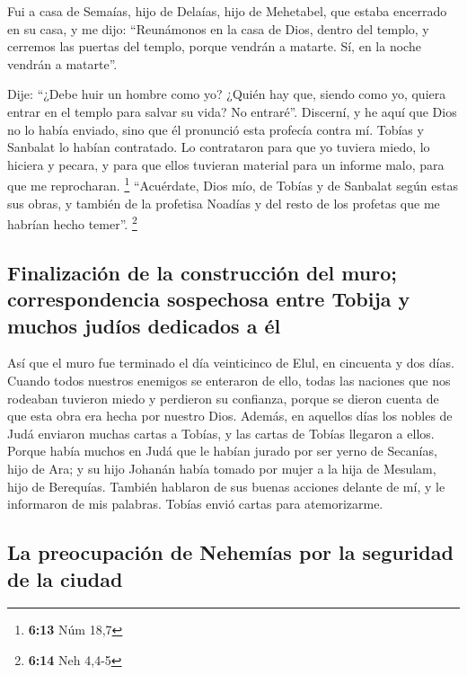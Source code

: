  Fui a casa de Semaías, hijo de Delaías, hijo de
Mehetabel, que estaba encerrado en su casa, y me dijo: ``Reunámonos en
la casa de Dios, dentro del templo, y cerremos las puertas del templo,
porque vendrán a matarte. Sí, en la noche vendrán a matarte''.

 Dije: ``¿Debe huir un hombre como yo? ¿Quién hay que,
siendo como yo, quiera entrar en el templo para salvar su vida? No
entraré''.  Discerní, y he aquí que Dios no lo había
enviado, sino que él pronunció esta profecía contra mí. Tobías y
Sanbalat lo habían contratado.  Lo contrataron para que
yo tuviera miedo, lo hiciera y pecara, y para que ellos tuvieran
material para un informe malo, para que me reprocharan. \footnote{\textbf{6:13}
  Núm 18,7}  ``Acuérdate, Dios mío, de Tobías y de
Sanbalat según estas sus obras, y también de la profetisa Noadías y del
resto de los profetas que me habrían hecho temer''. \footnote{\textbf{6:14}
  Neh 4,4-5}

\hypertarget{finalizaciuxf3n-de-la-construcciuxf3n-del-muro-correspondencia-sospechosa-entre-tobija-y-muchos-juduxedos-dedicados-a-uxe9l}{%
\subsection{Finalización de la construcción del muro; correspondencia
sospechosa entre Tobija y muchos judíos dedicados a
él}\label{finalizaciuxf3n-de-la-construcciuxf3n-del-muro-correspondencia-sospechosa-entre-tobija-y-muchos-juduxedos-dedicados-a-uxe9l}}

 Así que el muro fue terminado el día veinticinco de
Elul, en cincuenta y dos días.  Cuando todos nuestros
enemigos se enteraron de ello, todas las naciones que nos rodeaban
tuvieron miedo y perdieron su confianza, porque se dieron cuenta de que
esta obra era hecha por nuestro Dios.  Además, en
aquellos días los nobles de Judá enviaron muchas cartas a Tobías, y las
cartas de Tobías llegaron a ellos.  Porque había muchos
en Judá que le habían jurado por ser yerno de Secanías, hijo de Ara; y
su hijo Johanán había tomado por mujer a la hija de Mesulam, hijo de
Berequías.  También hablaron de sus buenas acciones
delante de mí, y le informaron de mis palabras. Tobías envió cartas para
atemorizarme.

\hypertarget{la-preocupaciuxf3n-de-nehemuxedas-por-la-seguridad-de-la-ciudad}{%
\subsection{La preocupación de Nehemías por la seguridad de la
ciudad}\label{la-preocupaciuxf3n-de-nehemuxedas-por-la-seguridad-de-la-ciudad}}


